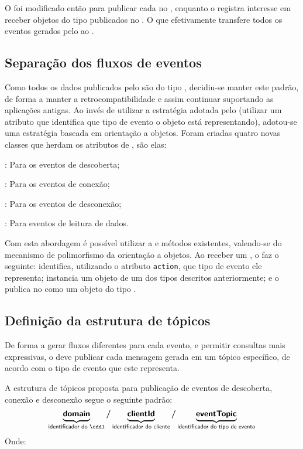 O \stwopa foi modificado então para publicar cada \sensordata no \eventbus, enquanto o \qocevaluator registra interesse em receber objetos do tipo \sensordata publicados no \eventbus.
O que efetivamente transfere todos os eventos gerados pelo \stwopa ao \cddl.

\subsection{Separação dos fluxos de eventos}

Como todos os dados publicados pelo \cddl são do tipo \msg, decidiu-se manter este padrão, de forma a manter a retrocompatibilidade e assim continuar suportando as aplicações antigas.
Ao invés de utilizar a estratégia adotada pelo \mhub (utilizar um atributo que identifica que tipo de evento o objeto está representando), adotou-se uma estratégia baseada em orientação a objetos.
Foram criadas quatro novas classes que herdam os atributos de \msg, são elas:

\begin{alineas}
	\item \objfoundmsg: Para os eventos de descoberta;
	\item \objconnectedmsg: Para os eventos de conexão;
	\item \objdisconnectedmsg: Para os eventos de desconexão;
	\item \sensordatamsg: Para eventos de leitura de dados.
\end{alineas}

Com esta abordagem é possível utilizar a \api e métodos existentes, valendo-se do mecanismo de polimorfismo da orientação a objetos.
Ao receber um \sensordata, o \qocevaluator faz o seguinte: identifica, utilizando o atributo \texttt{action}, que tipo de evento ele representa; instancia um objeto de um dos tipos descritos anteriormente; e o publica no \broker \mqtt como um objeto do tipo \msg.


\subsection{Definição da estrutura de tópicos}

De forma a gerar fluxos diferentes para cada evento, e permitir consultas mais expressivas, o \qocevaluator deve publicar cada mensagem gerada em um tópico específico, de acordo com o tipo de evento que este representa.

A estrutura de tópicos proposta para publicação de eventos de descoberta, conexão e desconexão segue o seguinte padrão:
\[
	\underbrace{\bm{\mathsf{domain}}\vphantom{p}}_{\text{\textsf{identificador do \cddl}}}
	\bm{/}
	\underbrace{\bm{\mathsf{clientId}}\vphantom{p}}_{\text{\textsf{identificador do cliente}}}
	\bm{/}
	\underbrace{\bm{\mathsf{eventTopic}}}_{\text{\textsf{identificador do tipo de evento}}}
\]
Onde:

